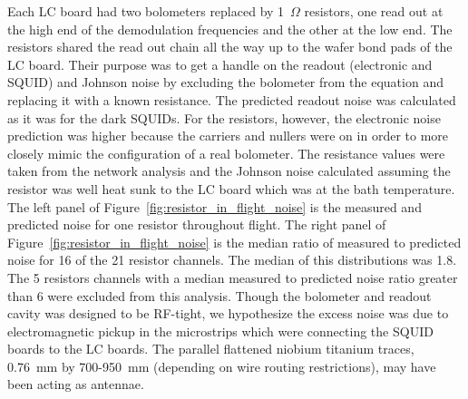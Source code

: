 Each \ac{LC} board had two bolometers replaced by 1~$\Omega$ resistors, one read out at the high end of the demodulation frequencies and the other at the low end. 
The resistors shared the read out chain all the way up to the wafer bond pads of the LC board. 
Their purpose was to get a handle on the readout (electronic and \ac{SQUID}) and Johnson noise by excluding the bolometer from the equation and replacing it with a known resistance. 
The predicted readout noise was calculated as it was for the dark \ac{SQUID}s. 
For the resistors, however, the electronic noise prediction was higher because the carriers and nullers were on in order to more closely mimic the configuration of a real bolometer. 
The resistance values were taken from the network analysis and the Johnson noise calculated assuming the resistor was well heat sunk to the \ac{LC} board which was at the bath temperature. 
The left panel of Figure~\ref{fig:resistor_in_flight_noise} is the measured and predicted noise for one resistor throughout flight. 
The right panel of Figure~\ref{fig:resistor_in_flight_noise} is the median ratio of measured to predicted noise for 16 of the 21 resistor channels.
The median of this distributions was 1.8.  
The 5 resistors channels with a median measured to predicted noise ratio greater than 6 were excluded from this analysis. 
Though the bolometer and readout cavity was designed to be RF-tight, we hypothesize the excess noise was due to electromagnetic pickup in the microstrips which were connecting the \ac{SQUID} boards to the \ac{LC} boards. 
The parallel flattened niobium titanium traces, 0.76~mm by 700-950~mm (depending on wire routing restrictions), may have been acting as antennae. 


